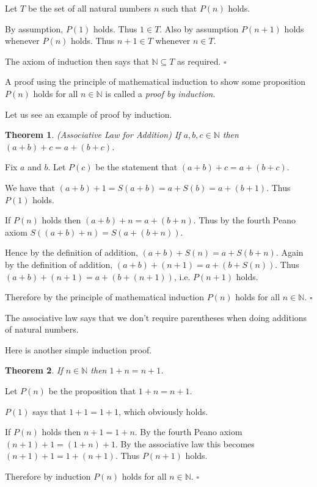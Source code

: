 \documentclass[10pt]{article}
\newcommand{\N}{\mathbb{N}}
\newcommand{\qed}{\square}
\newtheorem{theorem}{Theorem}[section]
\newenvironment{proof}[1][Proof]{\begin{trivlist}
\item[\hskip \labelsep {\bfseries #1}]}{\end{trivlist}}
\begin{document}
\begin{proof}
Let $T$ be the set of all natural numbers $n$ such that $P(n)$ holds. 

By assumption, $P(1)$ holds. Thus $1 \in T$. Also by assumption $P(n + 1)$ holds whenever $P(n)$ holds. Thus $n + 1 \in T$ whenever $n \in T$.

The axiom of induction then says that $\N \subseteq T$ as required. $\qed$
\end{proof}

A proof using the principle of mathematical induction to show some proposition $P(n)$ holds for all $n \in \N$ is called a \emph{proof by induction}.

Let us see an example of proof by induction.

\begin{theorem} (Associative Law for Addition)
If $a, b, c \in \N$ then $(a + b) + c = a + (b + c)$.
\end{theorem}

\begin{proof}
Fix $a$ and $b$. Let $P(c)$ be the statement that $(a + b) + c = a + (b + c)$. 

We have that $(a + b) + 1 = S(a + b) = a + S(b) = a + (b + 1)$. Thus $P(1)$ holds.

If $P(n)$ holds then $(a + b) + n = a + (b + n)$. Thus by the fourth Peano axiom $S((a + b) + n) = S(a + (b + n))$. 

Hence by the definition of addition, $(a + b) + S(n) = a + S(b + n)$. Again by the definition of addition, $(a + b) + (n + 1) = a + (b + S(n))$. Thus $(a + b) + (n + 1) = a + (b + (n + 1))$, i.e. $P(n + 1)$ holds.

Therefore by the principle of mathematical induction $P(n)$ holds for all $n \in \N$. $\qed$
\end{proof}

The associative law says that we don't require parentheses when doing additions of natural numbers. 

Here is another simple induction proof.

\begin{theorem}
If $n \in \N$ then $1 + n = n + 1$.
\end{theorem}

\begin{proof}
Let $P(n)$ be the proposition that $1 + n = n + 1$.

$P(1)$ says that $1 + 1 = 1 + 1$, which obviously holds.

If $P(n)$ holds then $n + 1 = 1 + n$. By the fourth Peano axiom $(n + 1) + 1 = (1 + n) + 1$. By the associative law this becomes $(n + 1) + 1 = 1 + (n + 1)$. Thus $P(n + 1)$ holds.

Therefore by induction $P(n)$ holds for all $n \in \N$. $\qed$
\end{proof}
\end{document}

